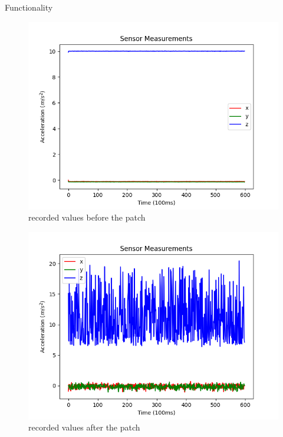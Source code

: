\documentclass[aspectratio=169]{beamer}
[aspectratio=169] %
\begin{document}
\begin{frame}{Functionality}
  \begin{minipage}{0.49\textwidth}
    \begin{figure}
      \centering
      \includegraphics[height=0.45\textheight]{figures/SensorValuesBefore.png}
      \caption{recorded values before the patch}
    \end{figure}
  \end{minipage}
  \hfill
  \begin{minipage}{0.49\textwidth}
    \begin{figure}
      \centering
      \includegraphics[height=0.45\textheight]{figures/SensorValuesAfter.png}
      \caption{recorded values after the patch}
    \end{figure}
  \end{minipage}
\end{frame}
\end{document}
